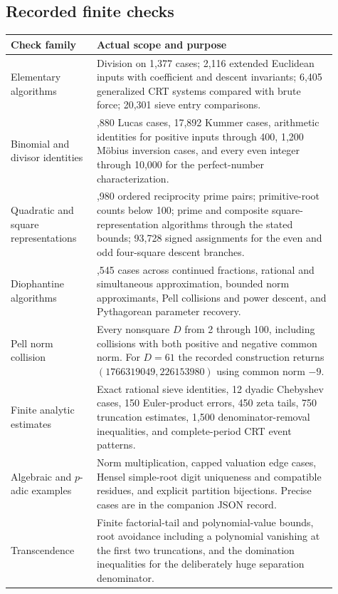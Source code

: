 \subsection{Recorded finite checks}
\begin{longtable}{>{\raggedright\arraybackslash}p{0.24\linewidth}>{\raggedright\arraybackslash}p{0.67\linewidth}}
\toprule
Check family & Actual scope and purpose\\
\midrule\endhead
Elementary algorithms & Division on 1,377 cases; 2,116 extended Euclidean inputs with coefficient and descent invariants; 6,405 generalized CRT systems compared with brute force; 20,301 sieve entry comparisons.\\
Binomial and divisor identities & 19,880 Lucas cases, 17,892 Kummer cases, arithmetic identities for positive inputs through 400, 1,200 M\"obius inversion cases, and every even integer through 10,000 for the perfect-number characterization.\\
Quadratic and square representations & 1,980 ordered reciprocity prime pairs; primitive-root counts below 100; prime and composite square-representation algorithms through the stated bounds; 93,728 signed assignments for the even and odd four-square descent branches.\\
Diophantine algorithms & 16,545 cases across continued fractions, rational and simultaneous approximation, bounded norm approximants, Pell collisions and power descent, and Pythagorean parameter recovery.\\
Pell norm collision & Every nonsquare $D$ from 2 through 100, including collisions with both positive and negative common norm. For $D=61$ the recorded construction returns $(1766319049,226153980)$ using common norm $-9$.\\
Finite analytic estimates & Exact rational sieve identities, 12 dyadic Chebyshev cases, 150 Euler-product errors, 450 zeta tails, 750 truncation estimates, 1,500 denominator-removal inequalities, and complete-period CRT event patterns.\\
Algebraic and $p$-adic examples & Norm multiplication, capped valuation edge cases, Hensel simple-root digit uniqueness and compatible residues, and explicit partition bijections. Precise cases are in the companion JSON record.\\
Transcendence & Finite factorial-tail and polynomial-value bounds, root avoidance including a polynomial vanishing at the first two truncations, and the domination inequalities for the deliberately huge separation denominator.\\
\bottomrule
\end{longtable}

